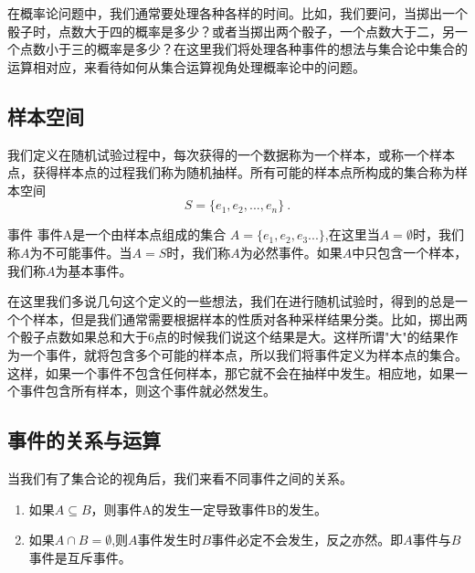 
\begin{issues}
\issueTODO
\end{issues}

在概率论问题中，我们通常要处理各种各样的时间。比如，我们要问，当掷出一个骰子时，点数大于四的概率是多少？或者当掷出两个骰子，一个点数大于二，另一个点数小于三的概率是多少？在这里我们将处理各种事件的想法与集合论中集合的运算相对应，来看待如何从集合运算视角处理概率论中的问题。
\subsection{样本空间}
我们定义在随机试验过程中，每次获得的一个数据称为一个样本，或称一个样本点，获得样本点的过程我们称为随机抽样。所有可能的样本点所构成的集合称为样本空间
\begin{equation}
S = \{e_1,e_2,...,e_n\}~.
\end{equation}
\begin{definition}{事件}
事件A是一个由样本点组成的集合 $A = \{e_1,e_2,e_3...\}$,在这里当$A=\emptyset$时，我们称$A$为不可能事件。当$A=S$时，我们称$A$为必然事件。如果$A$中只包含一个样本，我们称$A$为基本事件。
\end{definition}
在这里我们多说几句这个定义的一些想法，我们在进行随机试验时，得到的总是一个个样本，但是我们通常需要根据样本的性质对各种采样结果分类。比如，掷出两个骰子点数如果总和大于6点的时候我们说这个结果是大。这样所谓"大"的结果作为一个事件，就将包含多个可能的样本点，所以我们将事件定义为样本点的集合。这样，如果一个事件不包含任何样本，那它就不会在抽样中发生。相应地，如果一个事件包含所有样本，则这个事件就必然发生。
\subsection{事件的关系与运算}
当我们有了集合论的视角后，我们来看不同事件之间的关系。
\begin{enumerate}
\item 如果$A\subseteq B$，则事件A的发生一定导致事件B的发生。
\item 如果$A \cap B = \emptyset$,则$A$事件发生时$B$事件必定不会发生，反之亦然。即$A$事件与$B$事件是互斥事件。
\end{enumerate}

